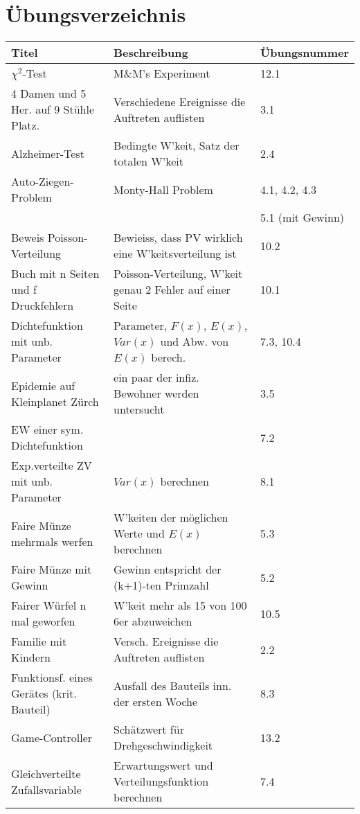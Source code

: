 \section{Übungsverzeichnis}
\begin{center}
\begin{tabular}{|l|l|l|}
\hline
\textbf{Titel} & \textbf{Beschreibung} & \textbf{Übungsnummer} \\ \hline
$\chi^2$-Test & M\&M's Experiment & 12.1 \\ \hline
4 Damen und 5 Her. auf 9 Stühle Platz. & Verschiedene Ereignisse die Auftreten auflisten & 3.1 \\ \hline
Alzheimer-Test & Bedingte W'keit, Satz der totalen W'keit & 2.4 \\ \hline
Auto-Ziegen-Problem & Monty-Hall Problem & 4.1, 4.2, 4.3 \\ & & 5.1 (mit Gewinn) \\ \hline
Beweis Poisson-Verteilung & Bewieiss, dass PV wirklich eine W'keitsverteilung ist & 10.2 \\ \hline
Buch mit n Seiten und f Druckfehlern & Poisson-Verteilung, W'keit genau 2 Fehler auf einer Seite & 10.1 \\ \hline
Dichtefunktion mit unb. Parameter & Parameter, $F(x)$, $E(x)$, $Var(x)$ und Abw. von $E(x)$ berech. & 7.3, 10.4 \\ \hline
Epidemie auf Kleinplanet Zürch & ein paar der infiz. Bewohner werden untersucht & 3.5 \\ \hline
EW einer sym. Dichtefunktion & & 7.2 \\ \hline
Exp.verteilte ZV mit unb. Parameter & $Var(x)$ berechnen & 8.1 \\ \hline
Faire Münze mehrmals werfen & W'keiten der möglichen Werte und $E(x)$ berechnen & 5.3 \\ \hline 
Faire Münze mit Gewinn & Gewinn entspricht der (k+1)-ten Primzahl & 5.2 \\ \hline
Fairer Würfel n mal geworfen & W'keit mehr als 15 von 100 6er abzuweichen & 10.5 \\ \hline
Familie mit Kindern & Versch. Ereignisse die Auftreten auflisten & 2.2 \\ \hline
Funktionsf. eines Gerätes (krit. Bauteil) & Ausfall des Bauteils inn. der ersten Woche & 8.3 \\ \hline
Game-Controller & Schätzwert für Drehgeschwindigkeit & 13.2 \\ \hline
Gleichverteilte Zufallsvariable & Erwartungswert und Verteilungsfunktion berechnen & 7.4 \\ \hline

\end{tabular}
\end{center}

